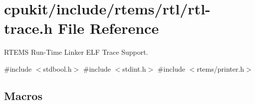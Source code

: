\hypertarget{rtl-trace_8h}{}\section{cpukit/include/rtems/rtl/rtl-\/trace.h File Reference}
\label{rtl-trace_8h}


R\+T\+E\+MS Run-\/\+Time Linker E\+LF Trace Support.  


{\ttfamily \#include $<$stdbool.\+h$>$}\newline
{\ttfamily \#include $<$stdint.\+h$>$}\newline
{\ttfamily \#include $<$rtems/printer.\+h$>$}\newline
\subsection*{Macros}
